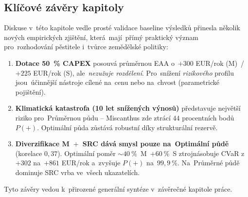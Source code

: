 \subsection{Klíčové závěry kapitoly}
\label{subsec:zaver-diskuse}

Diskuse v~této kapitole vedle prosté validace baseline výsledků přinesla
několik nových empirických zjištění, která~mají~přímý praktický význam
pro~rozhodování pěstitele i~tvůrce zemědělské politiky:
\begin{enumerate}
\item \textbf{Dotace 50~\% CAPEX} posouvá průměrnou EAA o~$+300$ EUR/rok
      (M)~/~$+225$ EUR/rok (S), ale~\emph{nezužuje rozdělení}. Pro~snížení
      \emph{rizikového} profilu jsou~účinnější nástroje cílené
      na~cenu nebo na~chvost (parametrické pojištění).
\item \textbf{Klimatická katastrofa (10 let snížených výnosů)}
      představuje největší riziko pro~Průměrnou půdu --
      Miscanthus zde ztrácí $44$ procentních bodů $P(+)$. Optimální
      půda zůstává robustní díky strukturální rezervě.
\item \textbf{Diverzifikace M~$+$~SRC dává smysl pouze na~Optimální půdě}
      (korelace $0{,}37$). Optimální poměr $\sim 40~\%$~M~$+ 60~\%$~S
      ztrojnásobuje CVaR z~$+302$ na~$+861$ EUR/rok a~zvyšuje $P(+)$
      na~$99{,}9~\%$. Na~Průměrné půdě dominuje SRC vrba ve~všech
      ukazatelích.
\end{enumerate}

Tyto závěry vedou k~přirozené generální syntéze v~závěrečné kapitole práce.
